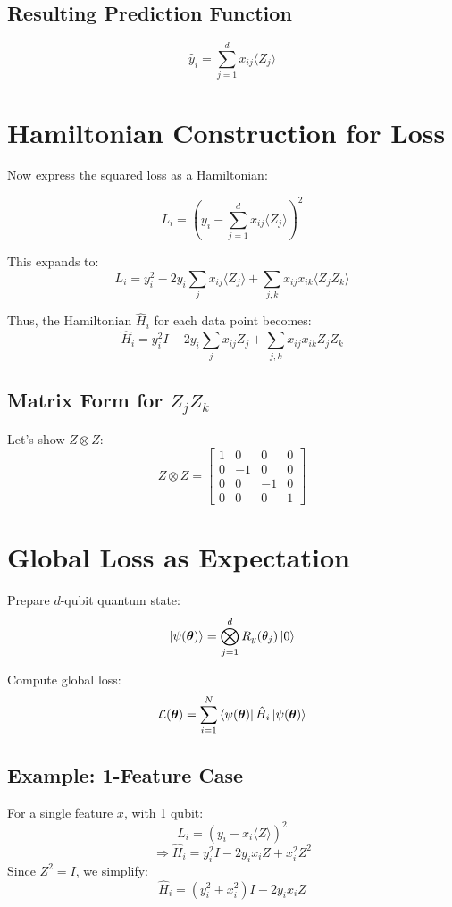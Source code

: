 \documentclass[11pt]{article}
\begin{document}
\subsection*{Resulting Prediction Function}
\[
\hat{y}_i = \sum_{j=1}^d x_{ij} \langle Z_j \rangle
\]

\section{Hamiltonian Construction for Loss}
Now express the squared loss as a Hamiltonian:

\[
L_i = \left( y_i - \sum_{j=1}^d x_{ij} \langle Z_j \rangle \right)^2
\]

This expands to:
\[
L_i = y_i^2 - 2 y_i \sum_j x_{ij} \langle Z_j \rangle + \sum_{j,k} x_{ij} x_{ik} \langle Z_j Z_k \rangle
\]

Thus, the Hamiltonian $\hat{H}_i$ for each data point becomes:
\[
\hat{H}_i = y_i^2 I - 2 y_i \sum_j x_{ij} Z_j + \sum_{j,k} x_{ij} x_{ik} Z_j Z_k
\]

\subsection*{Matrix Form for $Z_j Z_k$}
Let’s show $Z \otimes Z$:
\[
Z \otimes Z = 
\begin{bmatrix}
1 & 0 & 0 & 0 \\
0 & -1 & 0 & 0 \\
0 & 0 & -1 & 0 \\
0 & 0 & 0 & 1
\end{bmatrix}
\]

\section{Global Loss as Expectation}
Prepare $d$-qubit quantum state:
\[
\ket{\psi(\bm{\theta})} = \bigotimes_{j=1}^d R_y(\theta_j) \ket{0}
\]

Compute global loss:
\[
\mathcal{L}(\bm{\theta}) = \sum_{i=1}^N \bra{\psi(\bm{\theta})} \hat{H}_i \ket{\psi(\bm{\theta})}
\]

\subsection*{Example: 1-Feature Case}
For a single feature $x$, with 1 qubit:
\[
L_i = (y_i - x_i \langle Z \rangle)^2
\]
\[
\Rightarrow \hat{H}_i = y_i^2 I - 2 y_i x_i Z + x_i^2 Z^2
\]
Since \( Z^2 = I \), we simplify:
\[
\hat{H}_i = (y_i^2 + x_i^2) I - 2 y_i x_i Z
\]
\end{document}
